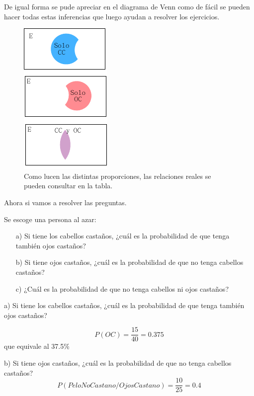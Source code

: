 \documentclass[11pt,letterpaper]{report}
\begin{document}
      De igual forma se pude apreciar en el diagrama de Venn como de fácil se pueden hacer todas estas inferencias que luego ayudan a resolver los ejercicios.

      \begin{figure}
          \centering
          \includegraphics[width=0.4\linewidth]{images/cp4}
          \caption{Como lucen las distintas proporciones, las relaciones reales se pueden consultar en la tabla. }
          \label{fig:cp4}
      \end{figure}


      Ahora si vamos a resolver las preguntas.

      Se escoge una persona al azar:
      \begin{itemize}
          \item[a)] Si tiene los cabellos castaños, ¿cuál es la probabilidad de que tenga también ojos castaños?
          \item[b)] Si tiene ojos castaños, ¿cuál es la probabilidad de que no tenga cabellos castaños?
          \item[c)] ¿Cuál es la probabilidad de que no tenga cabellos ni ojos castaños?
      \end{itemize}


         a) Si tiene los cabellos castaños, ¿cuál es la probabilidad de que tenga también ojos castaños?

         $$P(OC)=\dfrac{15}{40}=0.375$$
         que equivale al 37.5\%


         b) Si tiene ojos castaños, ¿cuál es la probabilidad de que no tenga cabellos  castaños?
         $$P(PeloNoCastano/OjosCastano)=\dfrac{10}{25}=0.4$$
\end{document}

